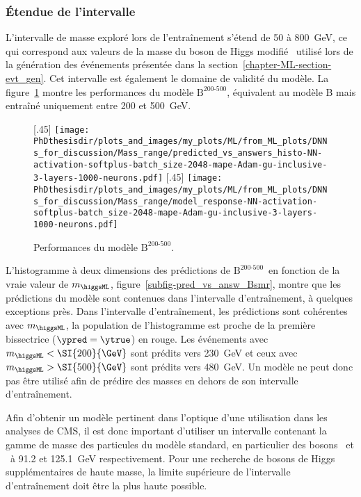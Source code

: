 \subsubsection{Étendue de l'intervalle}
\def\Bsmr{$\text{B}^\text{200-500}$}
L'intervalle de masse exploré lors de l'entraînement s'étend de \num{50} à \SI{800}{\GeV},
ce qui correspond aux valeurs de la masse du boson de Higgs modifié \higgsML\ utilisé lors de la génération des événements
présentée dans la section~\ref{chapter-ML-section-evt_gen}.
Cet intervalle est également le domaine de validité du modèle.
La figure~\ref{fig-Bsmr}
montre les performances du modèle \Bsmr,
équivalent au modèle B mais entraîné uniquement entre \num{200} et \SI{500}{\GeV}.
\begin{figure}[h]
\centering

[.45\textwidth]
{\texttt{[image: \\PhDthesisdir/plots\_and\_images/my\_plots/ML/from\_ML\_plots/DNNs\_for\_discussion/Mass\_range/predicted\_vs\_answers\_histo-NN-activation-softplus-batch\_size-2048-mape-Adam-gu-inclusive-3-layers-1000-neurons.pdf]}\vspace{-.5\baselineskip}}
\hfill
{}[.45\textwidth]
{\texttt{[image: \\PhDthesisdir/plots\_and\_images/my\_plots/ML/from\_ML\_plots/DNNs\_for\_discussion/Mass\_range/model\_response-NN-activation-softplus-batch\_size-2048-mape-Adam-gu-inclusive-3-layers-1000-neurons.pdf]}\vspace{-.5\baselineskip}}

\caption{Performances du modèle \Bsmr.}
\label{fig-Bsmr}
\end{figure}
\par
L'histogramme à deux dimensions des prédictions de \Bsmr\ en fonction de la vraie valeur de $m_{\higgsML}$,
figure~\ref{subfig-pred_vs_answ_Bsmr},
montre que les prédictions du modèle sont contenues dans l'intervalle d'entraînement,
à quelques exceptions près.
Dans l'intervalle d'entraînement, les prédictions sont cohérentes avec $m_{\higgsML}$,
la population de l'histogramme est proche de la première bissectrice ($\ypred=\ytrue$) en rouge.
Les événements
avec $m_{\higgsML}<\SI{200}{\GeV}$ sont prédits vers \SI{230}{\GeV}
et ceux 
avec $m_{\higgsML}>\SI{500}{\GeV}$ sont prédits vers \SI{480}{\GeV}.
Un modèle ne peut donc pas être utilisé afin de prédire des masses en dehors de son intervalle d'entraînement.
\par
Afin d'obtenir un modèle pertinent dans l'optique d'une utilisation dans les analyses de CMS,
il est donc important d'utiliser un intervalle
contenant la gamme de masse des particules du modèle standard,
en particulier des bosons \Zboson\ et \higgs\ à \num{91.2} et \SI{125.1}{\GeV} respectivement.
Pour une recherche de bosons de Higgs supplémentaires de haute masse,
la limite supérieure de l'intervalle d'entraînement doit être la plus haute possible.

